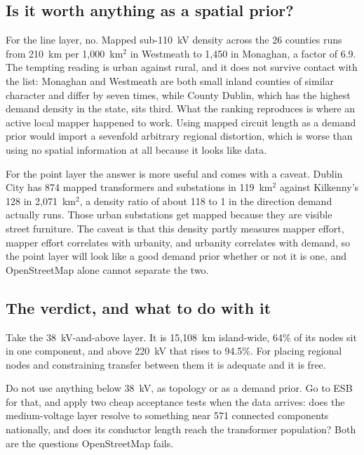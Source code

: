 \documentclass[11pt,a4paper]{article}
\begin{document}

\subsection{Is it worth anything as a spatial prior?}

For the line layer, no. Mapped sub-110~kV density across the 26 counties runs
from 210~km per 1{,}000~km$^2$ in Westmeath to 1{,}450 in Monaghan, a factor of
6.9. The tempting reading is urban against rural, and it does not survive
contact with the list: Monaghan and Westmeath are both small inland counties of
similar character and differ by seven times, while County Dublin, which has the
highest demand density in the state, sits third. What the ranking reproduces is
where an active local mapper happened to work. Using mapped circuit length as a
demand prior would import a sevenfold arbitrary regional distortion, which is
worse than using no spatial information at all because it looks like data.

For the point layer the answer is more useful and comes with a caveat. Dublin
City has 874 mapped transformers and substations in 119~km$^2$ against
Kilkenny's 128 in 2{,}071~km$^2$, a density ratio of about 118 to 1 in the
direction demand actually runs. Those urban substations get mapped because they
are visible street furniture. The caveat is that this density partly measures
mapper effort, mapper effort correlates with urbanity, and urbanity correlates
with demand, so the point layer will look like a good demand prior whether or
not it is one, and OpenStreetMap alone cannot separate the two.

\subsection{The verdict, and what to do with it}

Take the 38~kV-and-above layer. It is 15{,}108~km island-wide, 64\% of its
nodes sit in one component, and above 220~kV that rises to 94.5\%. For placing
regional nodes and constraining transfer between them it is adequate and it is
free.

Do not use anything below 38~kV, as topology or as a demand prior. Go to ESB
for that, and apply two cheap acceptance tests when the data arrives: does the
medium-voltage layer resolve to something near 571 connected components
nationally, and does its conductor length reach the transformer population?
Both are the questions OpenStreetMap fails.
\end{document}

